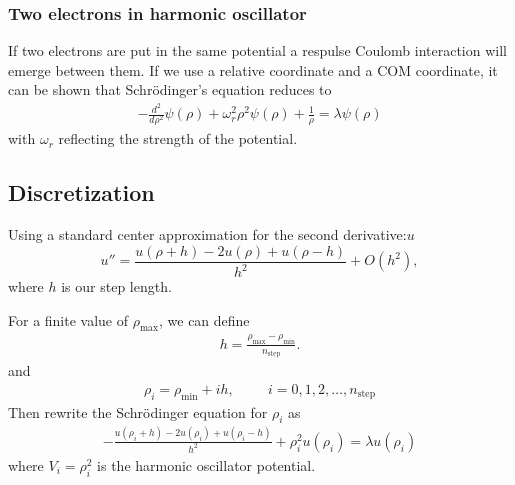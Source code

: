 \documentclass[11pt,a4paper,english,final]{article}
\numberwithin{equation}{section}
\begin{document}
 \subsubsection{Two electrons in harmonic oscillator}
If two electrons are put in the same potential a respulse Coulomb 
interaction will emerge between them. If we use a relative coordinate
and a COM coordinate, it can be shown that Schrödinger's equation
reduces to
\begin{gather}
 -\frac{d^2}{d\rho^2} \psi(\rho) + \omega_r^2\rho^2\psi(\rho) 
 +\frac{1}{\rho} = \lambda \psi(\rho)
\end{gather}
with $\omega_r$ reflecting the strength of the potential. 

 
 
 
\subsection{Discretization}

Using a standard center approximation for the second derivative:$u$
\begin{equation}
    u''=\frac{u(\rho+h) -2u(\rho) +u(\rho-h)}{h^2} +O(h^2),
    \label{eq:diffoperation}
\end{equation} 
where $h$ is our step length.

For a finite value of $\rho_{\mathrm{max}}$, we can define 
\begin{gather}
  h=\frac{\rho_{\mathrm{max}}-\rho_{\mathrm{min}} }{n_{\mathrm{step}}}.
\end{gather}
and 
\begin{gather}
    \rho_i= \rho_{\mathrm{min}} + ih, \hspace{1cm} i=0,1,2,\dots ,
    n_{\mathrm{step}}
\end{gather}
Then rewrite the Schrödinger equation for $\rho_i$ as
\begin{gather}
-\frac{u(\rho_i+h) -2u(\rho_i) +u(\rho_i-h)}{h^2}+\rho_i^2u(\rho_i) 
= \lambda u(\rho_i)
\end{gather}
where $V_i=\rho_i^2$ is the harmonic oscillator potential.
\end{document}

